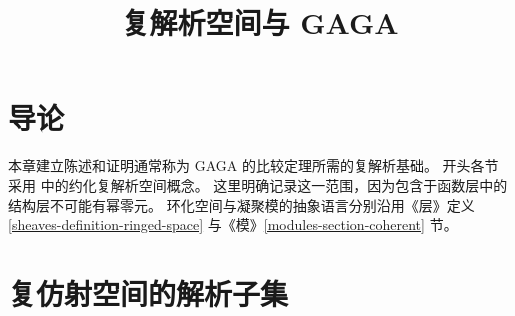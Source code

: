 
\def\GAGACJKMainFont{SimSun}

\renewcommand{\contentsname}{目录}
\renewcommand{\refname}{参考文献}
\renewcommand{\proofname}{证明}

\let\theorem\relax
\let\endtheorem\relax
\let\proposition\relax
\let\endproposition\relax
\let\lemma\relax
\let\endlemma\relax
\let\definition\relax
\let\enddefinition\relax
\let\remark\relax
\let\endremark\relax
\theoremstyle{plain}
\newtheorem{theorem}[subsection]{定理}
\newtheorem{proposition}[subsection]{命题}
\newtheorem{lemma}[subsection]{引理}
\theoremstyle{definition}
\newtheorem{definition}[subsection]{定义}
\theoremstyle{remark}
\newtheorem{remark}[subsection]{注}

%


\raggedbottom

\title{复解析空间与 GAGA}

\maketitle

\label{section-phantom}

\tableofcontents

\section{导论}
\label{section-introduction}

\noindent
本章建立陈述和证明通常称为 GAGA 的比较定理所需的复解析基础。
开头各节采用 \cite[\S 1，第 1--4 号，第 3--7 页]{GAGA} 中的约化复解析空间概念。
这里明确记录这一范围，因为包含于函数层中的结构层不可能有幂零元。
环化空间与凝聚模的抽象语言分别沿用《层》定义
\ref{sheaves-definition-ringed-space} 与《模》\ref{modules-section-coherent} 节。

\section{复仿射空间的解析子集}
\label{section-analytic-subsets}

